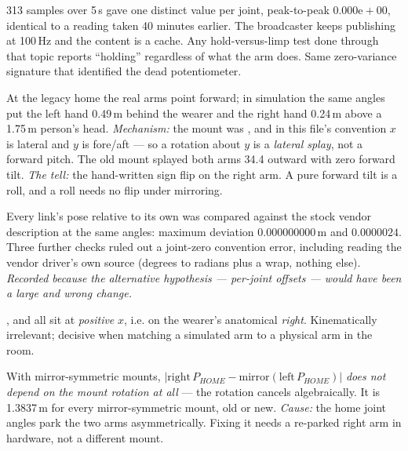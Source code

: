 {313 samples over 5\,s gave one distinct value per joint, peak-to-peak
$0.000\mathrm{e}{+}00$, identical to a reading taken 40 minutes earlier. The
broadcaster keeps publishing at 100\,Hz and the content is a cache. Any
hold-versus-limp test done through that topic reports ``holding'' regardless of
what the arm does. Same zero-variance signature that identified the dead
 potentiometer.}


{At the legacy home the real arms point forward; in simulation the same angles
put the left hand 0.49\,m behind the wearer and the right hand 0.24\,m above a
1.75\,m person's head. \textit{Mechanism:} the mount was
, and in this file's convention $x$ is lateral and $y$
is fore/aft --- so a rotation about $y$ is a \emph{lateral splay}, not a
forward pitch. The old mount splayed both arms 34.4\dg{} outward with zero
forward tilt. \textit{The tell:} the hand-written sign flip on the right arm.
A pure forward tilt is a roll, and a roll needs no flip under mirroring.}

{Every link's pose relative to its own  was compared against
the stock vendor description at the same angles: maximum deviation
$0.000000000$\,m and $0.0000024$\dg. Three further checks ruled out a
joint-zero convention error, including reading the vendor driver's own source
(degrees to radians plus a wrap, nothing else). \textit{Recorded because the
alternative hypothesis --- per-joint offsets --- would have been a large and
wrong change.}}

{,  and  all sit
at \emph{positive} $x$, i.e. on the wearer's anatomical \emph{right}.
Kinematically irrelevant; decisive when matching a simulated arm to a physical
arm in the room.}

{With mirror-symmetric mounts, $|\text{right}\,P_{HOME} -
\text{mirror}(\text{left}\,P_{HOME})|$ \emph{does not depend on the mount
rotation at all} --- the rotation cancels algebraically. It is 1.3837\,m for
every mirror-symmetric mount, old or new. \textit{Cause:} the home joint angles
park the two arms asymmetrically. Fixing it needs a re-parked right arm in
hardware, not a different mount.}

